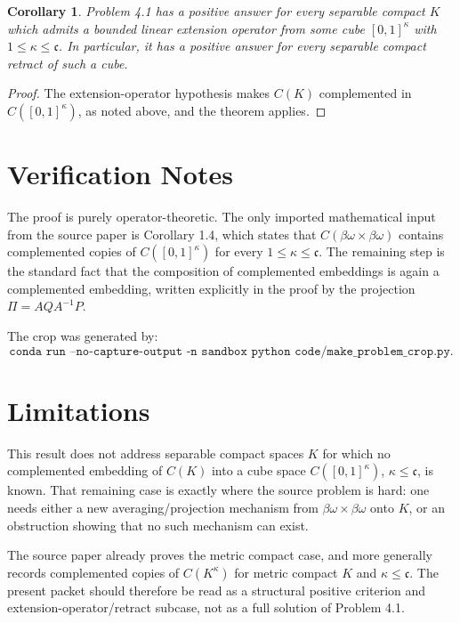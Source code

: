 \documentclass[11pt]{article}
\newtheorem{corollary}{Corollary}
\newcommand{\C}{C}
\newcommand{\bomega}{\beta\omega}
\newcommand{\cc}{\mathfrak c}
\begin{document}
\begin{corollary}
Problem 4.1 has a positive answer for every separable compact \(K\) which
admits a bounded linear extension operator from some cube
\([0,1]^\kappa\) with \(1\le \kappa\le\cc\).  In particular, it has a
positive answer for every separable compact retract of such a cube.
\end{corollary}

\begin{proof}
The extension-operator hypothesis makes \(\C(K)\) complemented in
\(\C([0,1]^\kappa)\), as noted above, and the theorem applies.
\end{proof}

\section*{Verification Notes}

The proof is purely operator-theoretic.  The only imported mathematical input
from the source paper is Corollary 1.4, which states that
\(\C(\bomega\times\bomega)\) contains complemented copies of
\(\C([0,1]^\kappa)\) for every \(1\le\kappa\le\cc\).  The remaining step is
the standard fact that the composition of complemented embeddings is again a
complemented embedding, written explicitly in the proof by the projection
\(\Pi=AQA^{-1}P\).

The crop was generated by:
\[
\texttt{conda run --no-capture-output -n sandbox python code/make\_problem\_crop.py}.
\]

\section*{Limitations}

This result does not address separable compact spaces \(K\) for which no
complemented embedding of \(\C(K)\) into a cube space \(\C([0,1]^\kappa)\),
\(\kappa\le\cc\), is known.  That remaining case is exactly where the source
problem is hard: one needs either a new averaging/projection mechanism from
\(\bomega\times\bomega\) onto \(K\), or an obstruction showing that no such
mechanism can exist.

The source paper already proves the metric compact case, and more generally
records complemented copies of \(\C(K^\kappa)\) for metric compact \(K\) and
\(\kappa\le\cc\).  The present packet should therefore be read as a structural
positive criterion and extension-operator/retract subcase, not as a full
solution of Problem 4.1.
\end{document}
